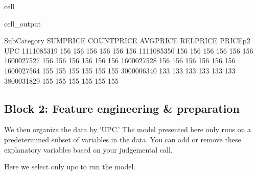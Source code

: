 \documentclass[letterpaper,10pt,english]{jupyterBook}
\begin{document}
\begin{sphinxuseclass}{cell}
\begin{sphinxVerbatimOutput}
\begin{sphinxuseclass}{cell_output}
\begin{sphinxVerbatim}[commandchars=\\\{\}]
            Sub\PYGZhy{}Category  SUMPRICE  COUNTPRICE  AVGPRICE  RELPRICE  PRICE\PYGZus{}p2  
UPC                                                                           
1111085319           156       156         156       156       156       156  
1111085350           156       156         156       156       156       156  
1600027527           156       156         156       156       156       156  
1600027528           156       156         156       156       156       156  
1600027564           155       155         155       155       155       155  
3000006340           133       133         133       133       133       133  
3800031829           155       155         155       155       155       155  
\end{sphinxVerbatim}

\end{sphinxuseclass}\end{sphinxVerbatimOutput}

\end{sphinxuseclass}

\subsection{Block 2: Feature engineering \& preparation}
\label{\detokenize{docs/Case1_1_Simple_Retail_Demand_Model:block-2-feature-engineering-preparation}}
\sphinxAtStartPar
We then organize the data by ‘UPC.’ The model presented here only runs on a predetermined subset of variables in the data. You can add or remove these explanatory variables based on your judgemental call.

\sphinxAtStartPar
Here we select only  upc to run the model.
\end{document}
